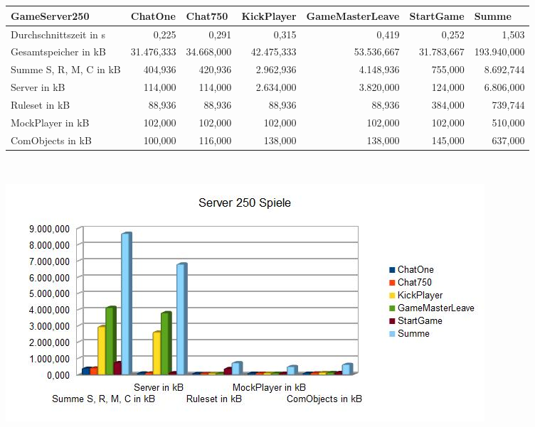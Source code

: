 \documentclass[a4paper]{article}
\begin{document}
\ \\
\ \\

\noindent
\begin{tabular}{|l|r|r|r|r|r|r|}
\hline
GameServer250 & \multicolumn{1}{l|}{ChatOne} & \multicolumn{1}{l|}{Chat750} & \multicolumn{1}{l|}{KickPlayer} & \multicolumn{1}{l|}{GameMasterLeave} & \multicolumn{1}{l|}{StartGame} & \multicolumn{1}{l|}{Summe} \\ \hline \hline
Durchschnittszeit in s & 0,225 & 0,291 & 0,315 & 0,419 & 0,252 & 1,503 \\ \hline
Gesamtspeicher in kB & 31.476,333 & 34.668,000 & 42.475,333 & 53.536,667 & 31.783,667 & 193.940,000 \\ \hline
Summe S, R, M, C in kB & 404,936 & 420,936 & 2.962,936 & 4.148,936 & 755,000 & 8.692,744 \\ \hline
Server in kB & 114,000 & 114,000 & 2.634,000 & 3.820,000 & 124,000 & 6.806,000 \\ \hline
Ruleset in kB & 88,936 & 88,936 & 88,936 & 88,936 & 384,000 & 739,744 \\ \hline
MockPlayer in kB & 102,000 & 102,000 & 102,000 & 102,000 & 102,000 & 510,000 \\ \hline
ComObjects in kB & 100,000 & 116,000 & 138,000 & 138,000 & 145,000 & 637,000 \\ \hline
\end{tabular}
\ \\
\begin{center}
\includegraphics[scale=0.7]{7}
\end{center}
\ \\
\ \\
\end{document}
